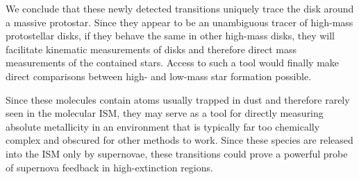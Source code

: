 \documentclass[12pt]{article}
\newcounter{lastnote}
\begin{document}
We conclude that these newly detected transitions uniquely trace the disk
around a massive protostar.  Since they appear to be an unambiguous tracer of
high-mass protostellar disks, if they behave the same in other high-mass disks,
they will facilitate kinematic measurements of disks and therefore direct mass
measurements of the contained stars.  Access to such a tool would finally make
direct comparisons between high- and low-mass star formation possible.

Since these molecules contain atoms usually trapped in dust and therefore
rarely seen in the molecular ISM, they may serve as a tool for directly
measuring absolute metallicity in an environment that is typically far too
chemically complex and obscured for other methods to work.  Since these
species are released into the ISM only by supernovae, these transitions
could prove a powerful probe of supernova feedback in high-extinction
regions. %







\end{document}
